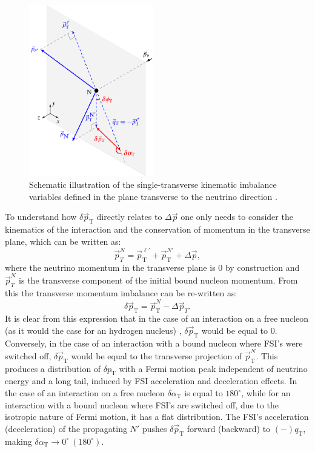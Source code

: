 \begin{figure}[t]
     \centering

         \includegraphics[width=0.48\textwidth]{figures/ch6-TKI/xl_diag.eps}
        \caption{Schematic illustration of the single-transverse kinematic imbalance variables defined in the plane transverse to the neutrino direction \cite{PhysRevC.94.015503}.} \label{fig:xl_diag}
\end{figure}

To understand how $\delta \Vec{p}_\text{T}$ directly relates to $\Delta \Vec{p}$ one only needs to consider the kinematics of the interaction and the conservation of momentum in the transverse plane, which can be written as:
\begin{equation}
    \Vec{p}_T^N = \Vec{p}_\text{T}^{\ell'}+\Vec{p}_\text{T}^{N'}+\Delta \Vec{p},
\end{equation}
where the neutrino momentum in the transverse plane is 0 by construction and $\Vec{p}_T^N$ is the transverse component of the initial bound nucleon momentum. From this the transverse momentum imbalance can be re-written as: 
\begin{equation}
    \delta \Vec{p}_\text{T} = \Vec{p}_\text{T}^{N}-\Delta \Vec{p}_T.
\end{equation}
It is clear from this expression that in the case of an interaction on a free nucleon (as it would the case for an hydrogen nucleus) , $\delta \Vec{p}_\text{T}$ would be equal to 0. Conversely, in the case of an interaction with a bound nucleon where FSI's were switched off, $\delta \Vec{p}_\text{T}$ would be equal to the transverse projection of $\Vec{p}_\text{T}^{N}$. This produces a distribution of $\delta p_\text{T}$ with a Fermi motion peak independent of neutrino energy and a long tail, induced by FSI acceleration and deceleration effects. In the case of an interaction on a free nucleon $\delta \alpha_\text{T}$ is equal to $180^\circ$, while for an interaction with a bound nucleon where FSI's are switched off, due to the isotropic nature of Fermi motion, it has a flat distribution. The FSI's acceleration (deceleration) of the propagating $N′$  pushes $\delta \Vec{p}_\text{T}$ forward (backward) to $(-)q_\text{T}$, making $\delta \alpha_\text{T}\rightarrow0^\circ \ (180^\circ)$.

